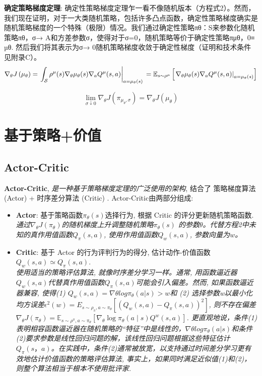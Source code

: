 \documentclass{article}
\begin{document}
        \textbf{确定策略梯度定理}: 确定性策略梯度定理乍一看不像随机版本（方程式2）。然而，我们现在证明，对于一大类随机策略，包括许多凸点函数，确定性策略梯度确实是随机策略梯度的一个特殊（极限）情况。我们通过确定性策略πθ：S来参数化随机策略πθ，σ→ A和方差参数σ，使得对于σ=0，随机策略等价于确定性策略πμθ，0≡ µθ. 然后我们将其表示为σ→ 0随机策略梯度收敛于确定性梯度（证明和技术条件见附录C）。
            $$\nabla_{\theta} J\left(\mu_{\theta}\right) =\left.\int_{\mathcal{S}} \rho^{\mu}(s) \nabla_{\theta} \mu_{\theta}(s) \nabla_{a} Q^{\mu}(s, a)\right|_{a=\mu_{\theta}(s)} \\=\mathbb{E}_{s \sim \rho^{\mu}}\left[\left.\nabla_{\theta} \mu_{\theta}(s) \nabla_{a} Q^{\mu}(s, a)\right|_{a=\mu_{\theta}(s)}\right]$$ 
            
            $$\lim _{\sigma \downarrow 0} \nabla_{\theta} J\left(\pi_{\mu_{\theta}, \sigma}\right)=\nabla_{\theta} J\left(\mu_{\theta}\right)$$

\section{基于策略+价值}
    \subsection{Actor-Critic}
        \textbf{Actor-Critic}, \textit{是一种基于策略梯度定理的广泛使用的架构}, 结合了 策略梯度算法 (Actor) + 时序差分算法 (Critic) . Actor-Critic由两部分组成:
    
        \begin{itemize}
            \item \textbf{Actor}: 基于策略函数$\pi_\theta(s)$选择行为, 根据 Critic 的评分更新随机策略函数. \\ \textit{通过$\nabla_{\theta} J\left(\pi_{\theta}\right)$的随机梯度上升调整随机策略$\pi_\theta(s)$ 的参数$\theta$。代替方程2中未知的真作用值函数$Q_\pi (s, a)$, 使用作用值函数$Q_w (s, a)$, 参数向量为$w$。}
            
            \item \textbf{Critic}: 基于 Actor 的行为评判行为的得分, 估计动作-价值函数$Q_w (s, a) \simeq  Q_\pi (s, a)$. \\ \textit{使用适当的策略评估算法, 就像时序差分学习一样。通常, 用函数逼近器$Q_w (s, a)$代替真作用值函数$Q_\pi (s, a)$可能会引入偏差。然而, 如果函数逼近器兼容, 使得(1) $Q_w (s, a) = \nabla \theta log \pi_\theta (a | s)>w$和 (2) 选择参数w以最小化均方误差$\epsilon^2 (w)=E_{s \sim \rho_\pi, a \sim \pi_\theta} [ (Q_w (s, a)− Q_\pi (s, a))^2]$, 则不存在偏差$\nabla_{\theta} J\left(\pi_{\theta}\right)=\mathbb{E}_{s \sim \rho^{\pi}, a \sim \pi_{\theta}}\left[\nabla_{\theta} \log \pi_{\theta}(a \mid s) Q^{w}(s, a)\right]$. 更直观地说，条件(1)表明相容函数逼近器在随机策略的“特征”中是线性的，$\nabla \theta log \pi_\theta (a | s)$和条件(2)要求参数是线性回归问题的解，该线性回归问题根据这些特征估计$Q_\pi(s，a)$。在实践中，条件(2)通常被放宽，以支持通过时间差分学习更有效地估计价值函数的策略评估算法, 事实上，如果同时满足近似值(1)和(2)，则整个算法相当于根本不使用批评家. }
        \end{itemize}
    
\end{document}
